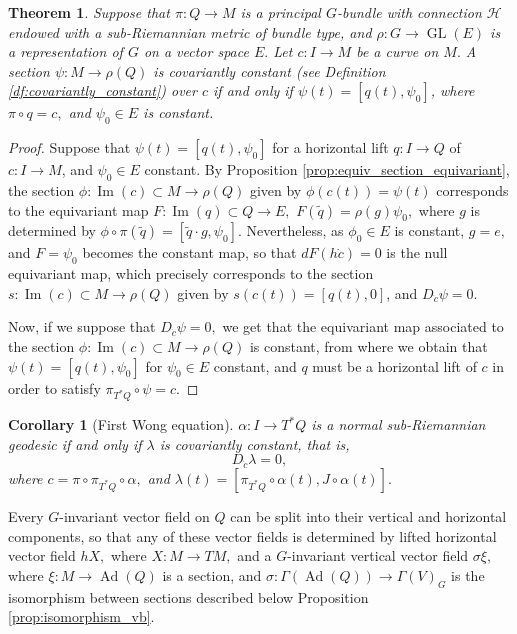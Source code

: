 \documentclass[12pt, letterpaper, reqno]{amsart}
\theoremstyle{definition}
\theoremstyle{plain}
\newtheorem{thm}{Theorem}
\newtheorem{cor}{Corollary}
\theoremstyle{remark}
\begin{document}
\begin{thm}
	Suppose that $ \pi: Q \rightarrow M $  is a principal $ G $-bundle with connection $ \mathcal{H} $ endowed with a sub-Riemannian metric of bundle type,  and $ \rho: G \rightarrow \operatorname{GL} (E) $ is a representation of $ G $ on a vector space $ E. $ Let $ c: I \rightarrow M $ be a curve on $ M. $ A section $ \psi: M \rightarrow \rho(Q) $   is covariantly constant (see Definition \ref{df:covariantly_constant}) over $ c $  if and only if $ \psi(t)= [q(t), \psi_0] $, where $ \pi\circ q = c,  $ and $ \psi_0\in E $ is constant.
\end{thm}
\begin{proof}
	Suppose that $ \psi(t)= [q(t), \psi_0] $ for a horizontal lift $ q: I \rightarrow Q $ of $ c: I \rightarrow M $, and $ \psi_0\in E $ constant. By Proposition \ref{prop:equiv_section_equivariant}, the section $ \phi: \operatorname{Im} (c)\subset M \rightarrow \rho(Q) $ given by $ \phi(c(t))=\psi(t) $ corresponds to the equivariant map $ F: \operatorname{Im} (q)  \subset Q \rightarrow E, $ $ F(\tilde q)= \rho(g)\psi_0, $ where $ g $ is determined by $ \phi\circ\pi(\tilde q) = [\tilde q \cdot g, \psi_0]. $ Nevertheless, as $ \phi_0\in E $ is constant, $ g=e, $ and $ F=\psi_0 $ becomes the constant map, so that $ dF(h\dot{c})=0 $ is the null equivariant map, which precisely corresponds to the section $ s: \operatorname{Im} (c) \subset M \rightarrow \rho(Q) $ given by $ s(c(t)) =[q(t), 0] $, and $ D_{\dot{c}}\psi=0. $ 

	Now, if we suppose that $ D_{\dot{c}}\psi=0, $ we get that the equivariant map associated to the section $ \phi: \operatorname{Im} (c)\subset M \rightarrow \rho(Q) $ is constant, from where we obtain that $ \psi(t)=[q(t), \psi_0] $ for $ \psi_0\in E $ constant, and $ q $ must be a horizontal lift of $ c $ in order to satisfy $ \pi_{T^*Q}\circ\psi =c. $ 
\end{proof}

\begin{cor}[First Wong equation]\label{cor:fwe}
	$\alpha: I \rightarrow T^*Q$ is a normal sub-Riemannian geodesic if and only if $ \lambda$ is covariantly constant, that is, $$ D_{\dot{c}}\lambda =0, $$ where $ c=\pi\circ\pi_{T^*Q}\circ\alpha, $ and $ \lambda(t)=[ \pi_{T^*Q}\circ\alpha(t), J\circ\alpha(t)]. $ 
\end{cor}
Every $ G $-invariant vector field on $ Q $ can be split into their vertical and horizontal components, so that any of these vector fields is determined by lifted horizontal vector field $ hX, $ where $ X: M \rightarrow TM, $ and a $ G $-invariant vertical vector field $ \sigma\xi, $ where $ \xi: M \rightarrow \operatorname{Ad} (Q) $ is a section, and $ \sigma: \Gamma( \operatorname{Ad} (Q)) \rightarrow \Gamma(V)_G $ is the isomorphism between sections described below Proposition \ref{prop:isomorphism_vb}.
\end{document}
